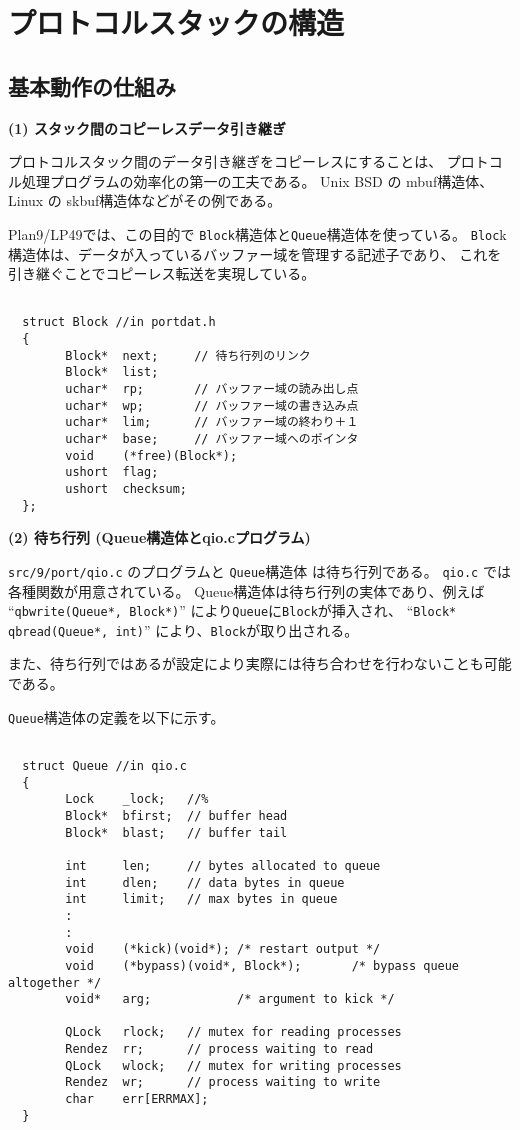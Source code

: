 \chapter{プロトコルスタックの構造}

\section{基本動作の仕組み}
{\bf \flushleft(1) スタック間のコピーレスデータ引き継ぎ}

    プロトコルスタック間のデータ引き継ぎをコピーレスにすることは、
プロトコル処理プログラムの効率化の第一の工夫である。
Unix BSD の mbuf構造体、Linux の skbuf構造体などがその例である。

Plan9/LP49では、この目的で {\tt Block}構造体と{\tt Queue}構造体を使っている。
{\tt Bloc}k構造体は、データが入っているバッファー域を管理する記述子であり、
これを引き継ぐことでコピーレス転送を実現している。


{\small
\begin{verbatim}

  struct Block //in portdat.h
  {
        Block*  next;     // 待ち行列のリンク
        Block*  list;
        uchar*  rp;       // バッファー域の読み出し点
        uchar*  wp;       // バッファー域の書き込み点
        uchar*  lim;      // バッファー域の終わり＋１
        uchar*  base;     // バッファー域へのポインタ
        void    (*free)(Block*);
        ushort  flag;
        ushort  checksum; 
  };

\end{verbatim}
}



{\bf \flushleft(2) 待ち行列 (Queue構造体とqio.cプログラム)}

   {\tt src/9/port/qio.c} のプログラムと {\tt Queue}構造体 は待ち行列である。
{\tt qio.c} では各種関数が用意されている。
Queue構造体は待ち行列の実体であり、例えば
``{\tt qbwrite(Queue*, Block*)}'' により{\tt Queue}に{\tt Block}が挿入され、
``{\tt Block* qbread(Queue*, int)}'' により、{\tt Block}が取り出される。

また、待ち行列ではあるが設定により実際には待ち合わせを行わないことも可能である。

{\tt Queue}構造体の定義を以下に示す。

{\small
\begin{verbatim}

  struct Queue //in qio.c
  {
        Lock    _lock;   //%
        Block*  bfirst;  // buffer head
        Block*  blast;   // buffer tail

        int     len;     // bytes allocated to queue 
        int     dlen;    // data bytes in queue 
        int     limit;   // max bytes in queue 
        :
        :
        void    (*kick)(void*); /* restart output */
        void    (*bypass)(void*, Block*);       /* bypass queue altogether */
        void*   arg;            /* argument to kick */

        QLock   rlock;   // mutex for reading processes 
        Rendez  rr;      // process waiting to read 
        QLock   wlock;   // mutex for writing processes 
        Rendez  wr;      // process waiting to write 
        char    err[ERRMAX];
  }
\end{verbatim}
}

